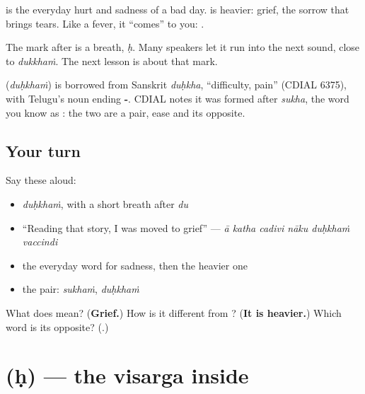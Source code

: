 \textbf{} is the everyday hurt and sadness of a bad day. \textbf{} is heavier: grief, the sorrow that brings tears. Like a fever, it \textquotedblleft{}comes\textquotedblright{} to you: \textbf{  }.

The mark after \textbf{} is a breath, \emph{ḥ}. Many speakers let it run into the next sound, close to \emph{dukkhaṁ}. The next lesson is about that mark.

\begin{cousinweb}
\textbf{} (\emph{duḥkhaṁ}) is borrowed from Sanskrit \emph{duḥkha}, \textquotedblleft{}difficulty, pain\textquotedblright{} (CDIAL 6375), with Telugu's noun ending \textbf{-}. CDIAL notes it was formed after \emph{sukha}, the word you know as \textbf{}: the two are a pair, ease and its opposite.
\end{cousinweb}

\subsection*{Your turn}
Say these aloud:

\begin{itemize}
\raggedright
  \item \emph{duḥkhaṁ}, with a short breath after \emph{du}
  \item \textquotedblleft{}Reading that story, I was moved to grief\textquotedblright{} — \emph{ā katha cadivi nāku duḥkhaṁ vaccindi}
  \item the everyday word for sadness, then the heavier one
  \item the pair: \emph{sukhaṁ}, \emph{duḥkhaṁ}
\end{itemize}

\begin{tcolorbox}[breakable,colback=teal!4,colframe=teal!35!black,title={Before you move on}]
What does \textbf{} mean? (\textbf{Grief.}) How is it different from \textbf{}? (\textbf{It is heavier.}) Which word is its opposite? (\textbf{}.)
\end{tcolorbox}
\section[\texorpdfstring{\te{ః} (ḥ)}{ః (ḥ)}]{ (ḥ) — the visarga inside }

\label{lesson:TE-S178-sign-visarga}



